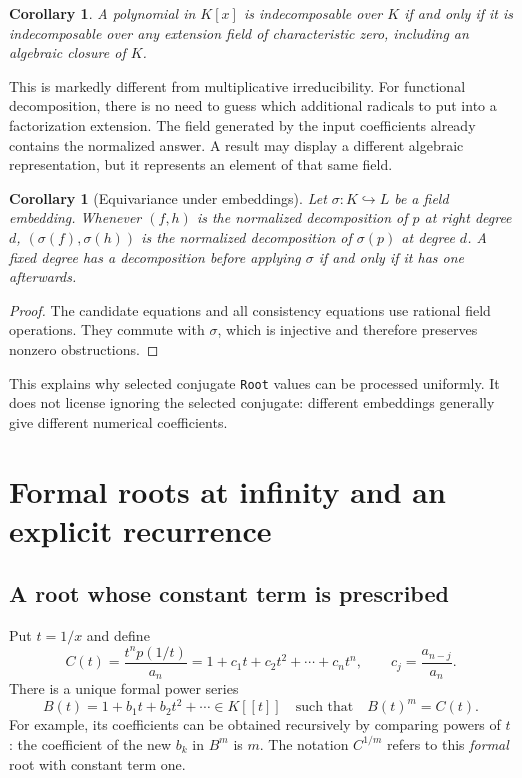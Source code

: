 \documentclass[11pt,letterpaper]{article}
\newtheorem{corollary}[theorem]{Corollary}
\theoremstyle{definition}
\theoremstyle{remark}
\newcommand{\wt}[1]{\texttt{#1}}
\begin{document}
\begin{corollary}\label{cor:absolute}
A polynomial in $K[x]$ is indecomposable over $K$ if and only if it is
indecomposable over any extension field of characteristic zero, including
an algebraic closure of $K$.
\end{corollary}

This is markedly different from multiplicative irreducibility. For
functional decomposition, there is no need to guess which additional
radicals to put into a factorization extension. The field generated by
the input coefficients already contains the normalized answer. A result
may display a different algebraic representation, but it represents an
element of that same field.

\begin{corollary}[Equivariance under embeddings]
Let $\sigma:K\hookrightarrow L$ be a field embedding. Whenever
$(f,h)$ is the normalized decomposition of $p$ at right degree $d$,
$(\sigma(f),\sigma(h))$ is the normalized decomposition of $\sigma(p)$
at degree $d$. A fixed degree has a decomposition before applying
$\sigma$ if and only if it has one afterwards.
\end{corollary}

\begin{proof}
The candidate equations and all consistency equations use rational field
operations. They commute with $\sigma$, which is injective and therefore
preserves nonzero obstructions.
\end{proof}

This explains why selected conjugate \wt{Root} values can be processed
uniformly. It does not license ignoring the selected conjugate: different
embeddings generally give different numerical coefficients.

\section{Formal roots at infinity and an explicit recurrence}
\label{sec:recurrence}

\subsection{A root whose constant term is prescribed}
Put $t=1/x$ and define
\begin{equation}\label{eq:C}
 C(t)=\frac{t^n p(1/t)}{a_n}
     =1+c_1t+c_2t^2+\cdots+c_nt^n,
 \qquad c_j=\frac{a_{n-j}}{a_n}.
\end{equation}
There is a unique formal power series
\[
 B(t)=1+b_1t+b_2t^2+\cdots\in K[[t]]
 \quad\text{such that}\quad B(t)^m=C(t).
\]
For example, its coefficients can be obtained recursively by comparing
powers of $t$: the coefficient of the new $b_k$ in $B^m$ is $m$.
The notation $C^{1/m}$ refers to this \emph{formal} root with constant
term one.
\end{document}
